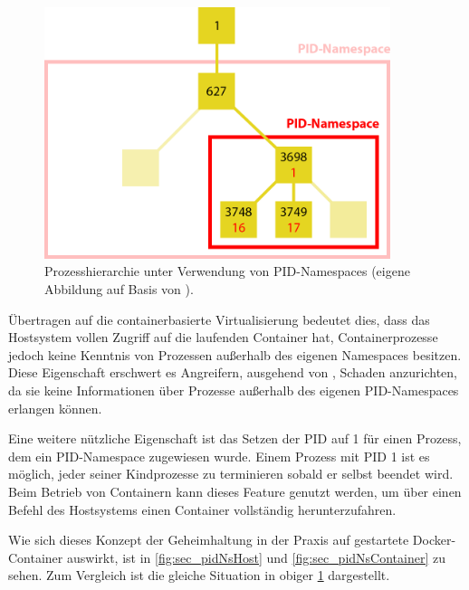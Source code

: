 \documentclass[../main.tex]{subfiles}
\begin{document}
			\vspace{0.5cm}
			\begin{figure}[h]
					\centering
					\includegraphics[width=0.9\textwidth]{./images/sec_pidNs.png}
					\caption{Prozesshierarchie unter Verwendung von PID-Namespaces (eigene Abbildung auf Basis von \cite{nsFigures}).}
					\label{fig:sec_pidNs}
			\end{figure}

			Übertragen auf die containerbasierte Virtualisierung bedeutet dies, dass das Hostsystem vollen Zugriff auf die laufenden Container hat, Containerprozesse jedoch keine Kenntnis von Prozessen außerhalb des eigenen Namespaces besitzen. Diese Eigenschaft erschwert es Angreifern, ausgehend von \cbroken{}, Schaden anzurichten, da sie keine Informationen über Prozesse außerhalb des eigenen PID-Namespaces erlangen können.

			Eine weitere nützliche Eigenschaft ist das Setzen der PID auf 1 für einen Prozess, dem ein PID-Namespace zugewiesen wurde. Einem Prozess mit PID 1 ist es möglich, jeder seiner Kindprozesse zu terminieren sobald er selbst beendet wird. Beim Betrieb von Containern kann dieses Feature genutzt werden, um über einen Befehl des Hostsystems einen Container vollständig herunterzufahren.



			Wie sich dieses Konzept der Geheimhaltung in der Praxis auf gestartete Docker-Container auswirkt, ist in \fig \ref{fig:sec_pidNsHost} und \fig \ref{fig:sec_pidNsContainer} zu sehen. Zum Vergleich ist die gleiche Situation in obiger \fig \ref{fig:sec_pidNs} dargestellt.
\end{document}
